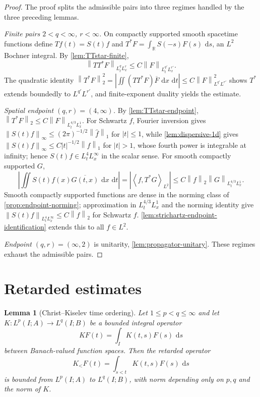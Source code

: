 \documentclass[11pt,oneside]{book}
\providecommand{\uses}[1]{}
\newtheorem{lemma}[theorem]{Lemma}
\theoremstyle{definition}
\theoremstyle{remark}
\newcommand{\R}{\mathbb R}
\newcommand{\1}{\mathbf 1}
\newcommand{\dd}{\,\mathrm d}
\newcommand{\norm}[1]{\left\lVert #1\right\rVert}
\newcommand{\pair}[2]{\left\langle #1,#2\right\rangle}
\begin{document}
\begin{proof}
\uses{lem:TTstar-finite, lem:TTstar-endpoint, lem:strichartz-endpoint-identification, lem:dispersive-1d, prop:endpoint-norming, lem:propagator-unitary}
The proof splits the admissible pairs into three regimes handled by the three preceding lemmas.

\emph{Finite pairs $2<q<\infty$, $r<\infty$.} On compactly supported smooth spacetime functions define $Tf(t)=S(t)f$ and $T^*F=\int_\R S(-s)F(s)\,\dd s$, an $L^2$ Bochner integral. By \cref{lem:TTstar-finite},
\[
 \norm{TT^*F}_{L^q_tL^r_x}\le C\norm F_{L^{q'}_tL^{r'}_x}.
\]
The quadratic identity $\norm{T^*F}_2^2=|\iint (TT^*F)\overline F\,\dd x\,\dd t|\le C\norm F_{L^{q'}L^{r'}}^2$ shows $T^*$ extends boundedly to $L^{q'}L^{r'}$, and finite-exponent duality yields the estimate.

\emph{Spatial endpoint $(q,r)=(4,\infty)$.} By \cref{lem:TTstar-endpoint}, $\norm{T^*F}_2\le C\norm F_{L^{4/3}_tL^1_x}$. For Schwartz $f$, Fourier inversion gives $\norm{S(t)f}_\infty\le(2\pi)^{-1/2}\norm{\widehat f}_1$ for $|t|\le1$, while \cref{lem:dispersive-1d} gives $\norm{S(t)f}_\infty\le C|t|^{-1/2}\norm f_1$ for $|t|>1$, whose fourth power is integrable at infinity; hence $S(t)f\in L^4_tL^\infty_x$ in the scalar sense. For smooth compactly supported $G$,
\[
 \left|\iint S(t)f(x)\overline{G(t,x)}\,\dd x\,\dd t\right|
 =|\pair f{T^*G}_{L^2}|
 \le C\norm f_2\norm G_{L^{4/3}_tL^1_x}.
\]
Smooth compactly supported functions are dense in the norming class of \cref{prop:endpoint-norming}; approximation in $L^{4/3}_tL^1_x$ and the norming identity give $\norm{S(t)f}_{L^4_tL^\infty_x}\le C\norm f_2$ for Schwartz $f$. \cref{lem:strichartz-endpoint-identification} extends this to all $f\in L^2$.

\emph{Endpoint $(q,r)=(\infty,2)$} is unitarity, \cref{lem:propagator-unitary}. These regimes exhaust the admissible pairs.
\end{proof}

\section{Retarded estimates}

\begin{lemma}[Christ--Kiselev time ordering]\label{lem:CK}
Let $1\le p<q\le\infty$ and let $K:L^p(I;A)\to L^q(I;B)$ be a bounded integral operator
\[
 KF(t)=\int_I K(t,s)F(s)\,\dd s
\]
between Banach-valued function spaces. Then the retarded operator
\[
 K_{<}F(t)=\int_{s<t}K(t,s)F(s)\,\dd s
\]
is bounded from $L^p(I;A)$ to $L^q(I;B)$, with norm depending only on $p,q$ and the norm of $K$.
\end{lemma}
\end{document}

